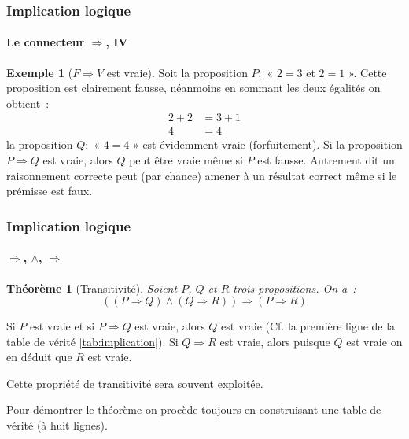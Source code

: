 \documentclass[10pt,notheorems]{beamer}
\theoremstyle{plain}
\newtheorem{theorem}{Théorème}
\theoremstyle{definition} %
\newtheorem{example}{Exemple}
\begin{document}
\begin{frame}
  \frametitle{Implication logique}
  \framesubtitle{Le connecteur $\Rightarrow$, IV}

  \begin{example}[$F\Rightarrow V$ est vraie]\label{ex:implication:3}
    Soit la proposition $P:$ « $2=3$ et $2=1$ ». Cette proposition est
    clairement fausse, néanmoins en sommant les deux égalités on
    obtient :
    \[
      \begin{split}
        2+2 &= 3+1\\
        4 &= 4
      \end{split}
    \]
    la proposition $Q:$ « $4=4$ » est évidemment vraie (forfuitement). Si la
    proposition $P\Rightarrow Q$ est vraie, alors $Q$ peut être vraie
    même si $P$ est fausse. Autrement dit un raisonnement correcte
    peut (par chance) amener à un résultat correct même si le prémisse
    est faux.
  \end{example}

\end{frame}


\begin{frame}
  \frametitle{Implication logique}
  \framesubtitle{$\Rightarrow$, $\land$, $\Rightarrow$}

  \begin{theorem}[Transitivité]\label{theorem:implication:transitivite}
    Soient $P$, $Q$ et $R$ trois propositions. On a :
    \[
      ((P\Rightarrow Q) \land (Q\Rightarrow R)) \Rightarrow
      (P\Rightarrow R)
    \]
  \end{theorem}

  \bigskip

  Si $P$ est vraie et si $P\Rightarrow Q$ est vraie, alors $Q$ est
  vraie (Cf. la première ligne de la table de vérité
  \ref{tab:implication}). Si $Q\Rightarrow R$ est vraie, alors puisque
  $Q$ est vraie on en déduit que $R$ est vraie.\newline

  Cette propriété de transitivité sera souvent exploitée.\newline

  Pour démontrer le théorème on procède toujours en construisant une
  table de vérité (à huit lignes).\newline

\end{frame}
\end{document}
